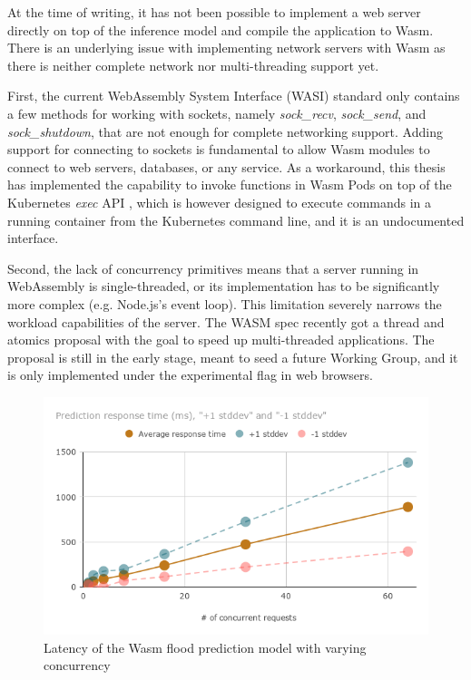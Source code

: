 At the time of writing, it has not been possible to implement a web server directly on top of the inference model and compile the application to Wasm. There is an underlying issue with implementing network servers with Wasm as there is neither complete network nor multi-threading support yet.

First, the current WebAssembly System Interface (WASI) standard only contains a few methods for working with sockets, namely \emph{sock\_recv}, \emph{sock\_send}, and \emph{sock\_shutdown}, that are not enough for complete networking support. Adding support for connecting to sockets is fundamental to allow Wasm modules to connect to web servers, databases, or any service. As a workaround, this thesis has implemented the capability to invoke functions in Wasm Pods on top of the Kubernetes \emph{exec} API \cite{k8s-exec}, which is however designed to execute commands in a running container from the Kubernetes command line, and it is an undocumented interface.

Second, the lack of concurrency primitives means that a server running in WebAssembly is single-threaded, or its implementation has to be significantly more complex (e.g. Node.js's event loop). This limitation severely narrows the workload capabilities of the server. The WASM spec recently got a thread and atomics proposal with the goal to speed up multi-threaded applications. The proposal is still in the early stage, meant to seed a future Working Group, and it is only implemented under the experimental flag in web browsers.

\begin{figure}[ht]
\centering
\includegraphics[width=\columnwidth]{figures/b-krustlet-4}
\caption{Latency of the Wasm flood prediction model with varying concurrency \label{fig:b-krustlet-4}}
\end{figure}

